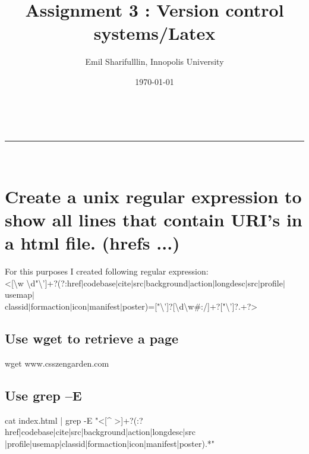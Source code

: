 \documentclass[a4paper,11pt]{article}
\makeatletter
\newcommand*{\TitleFont}{%
      \usefont{\encodingdefault}{\rmdefault}{b}{n}%
      \fontsize{16}{20}%
      \selectfont}
\renewcommand{\maketitle}{
\begin{center}
\vspace{2ex}
{\huge \textsc{\@title}}
\vspace{1ex}
\\
\rule{\linewidth}{0.5pt}\\
\@author \hfill \@date
\vspace{4ex}
\end{center}
}
\makeatother
\begin{document}







\title{ \TitleFont Assignment 3 : Version control systems/Latex }

\author{Emil Sharifulllin, Innopolis University}

\date{\today}

\maketitle

\section{Create a unix regular expression to show all lines that contain
URI’s in a html file. (hrefs ...)}

For this purposes I created following regular expression: \\


\textless{}[\textbackslash{}w \textbackslash{}d"\textbackslash{}']+?(?:href$|$codebase$|$cite$|$src$|$background$|$action$|$longdesc$|$src$|$profile$|$usemap$|$\\classid$|$formaction$|$icon$|$manifest$|$poster)=["\textbackslash{}']?[\textbackslash{}d\textbackslash{}w\#:/]+?["\textbackslash{}']?.+?\textgreater{}




\subsection{Use wget to retrieve a page}

\begin{bashcode}
wget www.csszengarden.com
\end{bashcode}

\subsection{Use grep –E}
\begin{bashcode}
cat index.html | grep -E "<[^ >]+?(:? href|codebase|cite|src|background|action|longdesc|src |profile|usemap|classid|formaction|icon|manifest|poster).*"
\end{bashcode}
\end{document}
